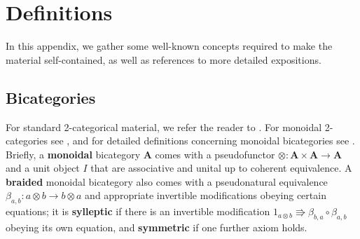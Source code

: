 \documentclass[ a4paper, onecolumn, superscriptaddress,10pt, accepted=2022-02-14, issue=3, volume=4, shorttitle=papers/compositionality-4-3 ]{compositionalityarticle}
\let\maps\colon
\newcommand{\bicat}{\mathbf}
\newcommand{\bA}{\bicat{A}}
\newcommand{\define}[1]{{\rm \textbf{#1}}}
\newcommand{\ot}{\otimes}
\begin{document}
\appendix

\section{Definitions}
In this appendix, we gather some well-known concepts required to make the material self-contained, as well as references to more detailed expositions.

\subsection{Bicategories}
\label{subsec:bicats}

For standard 2-categorical material, we refer the reader to \cite{KS}.  For monoidal 2-categories see \cite{DS}, and for detailed definitions concerning monoidal bicategories see \cite{GPS,McCrudden,Stay}.  Briefly, a \define{monoidal} bicategory $\bA$ comes with a pseudofunctor $\otimes\maps\bA\times\bA\to\bA$ and a unit object $I$ that are associative and unital up to coherent equivalence. A \define{braided} monoidal bicategory also comes with a pseudonatural equivalence $\beta_{a,b}\maps a\ot b\to b\ot a$ and appropriate invertible modifications obeying certain equations; it is \define{sylleptic} if there is an invertible modification $1_{a\ot b}\Rrightarrow\beta_{b,a}\circ\beta_{a,b}$ obeying its own equation, and \define{symmetric} if one further axiom holds.
\end{document}
